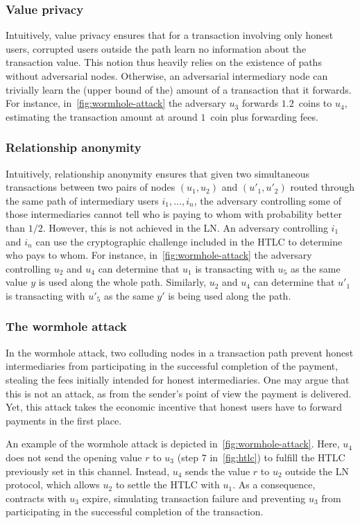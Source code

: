 \subsubsection{Value privacy}
Intuitively, value privacy ensures that for a transaction involving only honest users, corrupted users outside the path learn no information about the transaction value.
This notion thus heavily relies on the existence of paths without adversarial nodes.
Otherwise, an adversarial intermediary node can trivially learn the (upper bound of the) amount of a transaction that it forwards.
For instance, in~\cref{fig:wormhole-attack} the adversary $u_3$ forwards $1.2$~coins to $u_4$, estimating the transaction amount at around $1$~coin plus forwarding fees.

\subsubsection{Relationship anonymity}
Intuitively, relationship anonymity ensures that given two simultaneous transactions between two pairs of nodes $(u_1, u_2)$ and $(u'_1, u'_2)$ routed through the same path of intermediary users $i_1, \ldots, i_n$, the adversary controlling some of those intermediaries cannot tell who is paying to whom with probability better than $1/2$.
However, this is not achieved in the LN.
An adversary controlling $i_1$ and $i_n$ can use the cryptographic challenge included in the HTLC to determine who pays to whom.
For instance, in~\cref{fig:wormhole-attack} the adversary controlling $u_2$ and $u_4$ can determine that $u_1$ is transacting with $u_5$ as the same value $y$ is used along the whole path.
Similarly, $u_2$ and $u_4$ can determine that $u'_1$ is transacting with $u'_5$ as the same $y'$ is being used along the path.

\subsubsection{The wormhole attack}
In the wormhole attack, two colluding nodes in a transaction path prevent honest intermediaries from participating in the successful completion of the payment, stealing the fees initially intended for honest intermediaries.
One may argue that this is not an attack, as from the sender's point of view the payment is delivered.
Yet, this attack takes the economic incentive that honest users have to forward payments in the first place.

An example of the wormhole attack is depicted in~\cref{fig:wormhole-attack}.
Here, $u_4$ does not send the opening value $r$ to $u_3$ (step 7 in~\cref{fig:htlc}) to fulfill the HTLC previously set in this channel.
Instead, $u_4$ sends the value $r$ to $u_2$ outside the LN protocol, which allows $u_2$ to settle the HTLC with $u_1$.
As a consequence, contracts with $u_3$ expire, simulating transaction failure and preventing $u_3$ from participating in the successful completion of the transaction.


